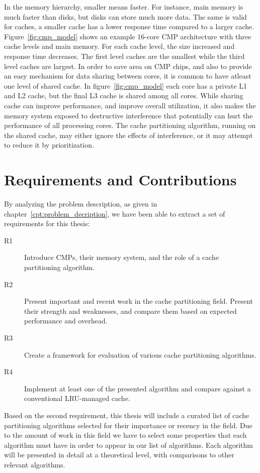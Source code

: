 In the memory hierarchy, smaller means faster. 
For instance, main memory is much faster than disks, but disks can store much more data.
The same is valid for caches, a smaller cache has a lower response time compared to a larger cache.
Figure~\ref{fig:cmp_model} shows an example 16-core CMP architecture with three cache levels and main memory.
For each cache level, the size increased and response time decreases.
The first level caches are the smallest while the third level caches are largest.
In order to save area on CMP chips, and also to provide an easy mechanism for data sharing between cores, it is common to have atleast one level of shared cache.
In figure~\ref{fig:cmp_model} each core has a private L1 and L2 cache, but the final L3 cache is shared among all cores.
While sharing cache can improve performance, and improve overall utilization, it also makes the memory system exposed to destructive interference that potentially can hurt the performance of all processing cores. 
The cache partitioning algorithm, running on the shared cache, may either ignore the effects of interference, or it may attempt to reduce it by prioritization.


\section{Requirements and Contributions}
By analyzing the problem description, as given in chapter~\ref{cpt:problem_decription}, we have been able to extract a set of requirements for this thesis:

\begin{description}
    \item[R1] Introduce CMPs, their memory system, and the role of a cache partitioning algorithm.
    \item[R2] Present important and recent work in the cache partitioning field. Present their strength and weaknesses, and compare them based on expected performance and overhead.
    \item[R3] Create a framework for evaluation of various cache partitioning algorithms.
    \item[R4] Implement at least one of the presented algorithm and compare against a conventional LRU-managed cache.
\end{description}

Based on the second requirement, this thesis will include a curated list of cache partitioning algorithms selected for their importance or recency in the field.
Due to the amount of work in this field we have to select some properties that each algorithm must have in order to appear in our list of algorithms.
Each algorithm will be presented in detail at a theoretical level, with comparisons to other relevant algorithms.

